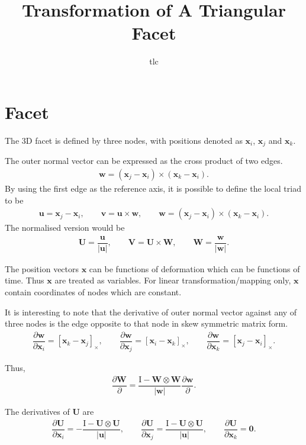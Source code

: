 \documentclass[10pt,fleqn,3p]{elsarticle}
\title{Transformation of A Triangular Facet}\date{}\author{tlc}
\newcommand*{\skewsymm}[1]{\left[#1\right]_\times}
\newcommand*{\pfrac}[2]{\dfrac{\partial#1}{\partial#2}}
\begin{document}
\pagestyle{empty}
\section*{Facet}
The 3D facet is defined by three nodes, with positions denoted as $\mathbold{x}_i$, $\mathbold{x}_j$ and $\mathbold{x}_k$.

The outer normal vector can be expressed as the cross product of two edges.
\begin{gather*}
\mathbold{w}=\left(\mathbold{x}_j-\mathbold{x}_i\right)\times\left(\mathbold{x}_k-\mathbold{x}_i\right).
\end{gather*}
By using the first edge as the reference axis, it is possible to define the local triad to be
\begin{gather*}
\mathbold{u}=\mathbold{x}_j-\mathbold{x}_i,\qquad
\mathbold{v}=\mathbold{u}\times\mathbold{w},\qquad
\mathbold{w}=\left(\mathbold{x}_j-\mathbold{x}_i\right)\times\left(\mathbold{x}_k-\mathbold{x}_i\right).
\end{gather*}
The normalised version would be
\begin{gather*}
\mathbold{U}=\dfrac{\mathbold{u}}{|\mathbold{u}|},\qquad
\mathbold{V}=\mathbold{U}\times\mathbold{W},\qquad
\mathbold{W}=\dfrac{\mathbold{w}}{|\mathbold{w}|}.
\end{gather*}

The position vectors $\mathbold{x}$ can be functions of deformation which can be functions of time. Thus $\mathbold{x}$ are treated as variables. For linear transformation/mapping only, $\mathbold{x}$ contain coordinates of nodes which are constant.

It is interesting to note that the derivative of outer normal vector against any of three nodes is the edge opposite to that node in skew symmetric matrix form.
\begin{gather*}
\pfrac{\mathbold{w}}{\mathbold{x}_i}=\skewsymm{\mathbold{x}_k-\mathbold{x}_j},\qquad
\pfrac{\mathbold{w}}{\mathbold{x}_j}=\skewsymm{\mathbold{x}_i-\mathbold{x}_k},\qquad
\pfrac{\mathbold{w}}{\mathbold{x}_k}=\skewsymm{\mathbold{x}_j-\mathbold{x}_i}.
\end{gather*}

Thus,
\begin{gather*}
\pfrac{\mathbold{W}}{}=\dfrac{\mathbold{\mathrm{I}}-\mathbold{W}\otimes\mathbold{W}}{|\mathbold{w}|}\pfrac{\mathbold{w}}{}.
\end{gather*}

The derivatives of $\mathbold{U}$ are
\begin{gather*}
\pfrac{\mathbold{U}}{\mathbold{x}_i}=-\dfrac{\mathbold{\mathrm{I}}-\mathbold{U}\otimes\mathbold{U}}{|\mathbold{u}|},\qquad
\pfrac{\mathbold{U}}{\mathbold{x}_j}=\dfrac{\mathbold{\mathrm{I}}-\mathbold{U}\otimes\mathbold{U}}{|\mathbold{u}|},\qquad
\pfrac{\mathbold{U}}{\mathbold{x}_k}=\mathbold{0}.
\end{gather*}
\end{document}
